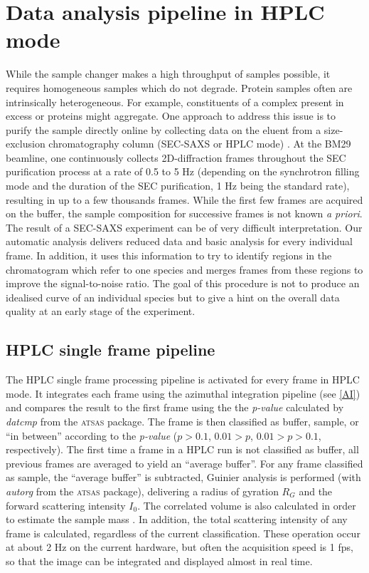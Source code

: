 \documentclass[preprint,pdf]{iucr}              %
\begin{document}
\section{Data analysis pipeline in HPLC mode}
While the sample changer makes a high throughput of samples possible, it
requires homogeneous samples which do not degrade.
Protein samples often are intrinsically heterogeneous.
For example, constituents of a complex present in excess or proteins
might aggregate.
One approach to address this issue is to purify the sample directly online by collecting data
on the eluent from a size-exclusion chromatography column (SEC-SAXS or HPLC
mode) \cite{SECPaper2012,SECP12,SECSWING,}.
At the BM29 beamline, one continuously collects 2D-diffraction frames
throughout the SEC purification process at a rate of 0.5 to 5 Hz
(depending on the synchrotron filling mode and the duration of the SEC
purification, 1 Hz being the standard rate), resulting in up to a few thousands
frames.
While the first few frames are acquired on the buffer, the sample composition
for successive frames is not known \textit{a priori}.
The result of a SEC-SAXS experiment can be of very difficult interpretation.
Our automatic analysis delivers reduced data and basic analysis for
every individual frame.
In addition, it uses this information to try to identify regions in the
chromatogram which refer to one species and merges frames from these
regions to improve the signal-to-noise ratio.
The goal of this procedure is not to produce an idealised curve of an individual
species but to give a hint on the overall data quality at an early stage of
the experiment.

\subsection{HPLC single frame pipeline}

The HPLC single frame processing pipeline is activated for every frame in HPLC
mode.
It integrates each frame using the azimuthal integration pipeline (see
\ref{AI}) and compares the result to the first frame using the the
\textit{p-value} calculated by \textit{datcmp} from the \textsc{atsas} package.
The frame is then classified as buffer, sample, or ``in between''
according to the \textit{p-value} ($p>0.1$, $0.01 > p$, $0.01>p>0.1$, 
respectively).
The first time a frame in a HPLC run is not classified as buffer, all previous
frames are averaged to yield an ``average buffer''.
For any frame classified as sample, the ``average buffer'' is subtracted, Guinier
analysis is performed (with \textit{autorg} from the \textsc{atsas} package),
delivering a radius of gyration $R_G$ and the forward scattering intensity
$I_0$. The correlated volume is also calculated in order to estimate the
sample mass \cite{RamboTainerNature2013}.
In addition, the total scattering intensity of any
frame is calculated, regardless of the current classification.
These operation occur at about 2 Hz on the current hardware, but often the
acquisition speed is 1 fps, so that the image can be integrated and displayed
almost in real time.
\end{document}
